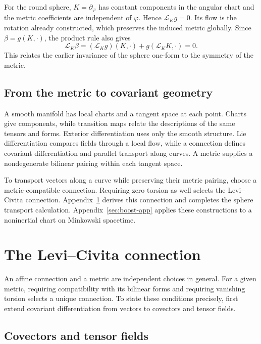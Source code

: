 \documentclass[11pt,a4paper]{article}
\numberwithin{equation}{section}
\newcommand{\Lie}{\mathcal L}
\newcommand{\slideref}[1]{\par\nobreak\smallskip\nobreak{\footnotesize\color{ink!60}\textsc{Source slide #1}}\par\nobreak\smallskip\nobreak}
\begin{document}
For the round sphere, \(K=\partial_\varphi\) has constant components
in the angular chart and the metric coefficients are independent of
\(\varphi\). Hence \(\Lie_Kg=0\). Its flow is the rotation already
constructed, which preserves the induced metric globally. Since
\(\beta=g(K,\cdot)\), the product rule also gives
\[
 \Lie_K\beta=(\Lie_Kg)(K,\cdot)+g(\Lie_KK,\cdot)=0.
\]
This relates the earlier invariance of the sphere one-form to the
symmetry of the metric.

\subsection{From the metric to covariant geometry}
\slideref{20}

A smooth manifold has local charts and a tangent space at each point.
Charts give components, while transition maps relate the descriptions
of the same tensors and forms. Exterior differentiation uses only the
smooth structure. Lie differentiation compares fields through a local
flow, while a connection defines covariant differentiation and
parallel transport along curves. A metric supplies a nondegenerate
bilinear pairing within each tangent space.

To transport vectors along a curve while preserving their metric
pairing, choose a metric-compatible connection. Requiring zero torsion
as well selects the Levi--Civita connection.
Appendix~\ref{sec:levi-civita} derives this connection and completes
the sphere transport calculation. Appendix~\ref{sec:boost-app}
applies these constructions to a noninertial chart on Minkowski
spacetime.

\appendix
\renewcommand{\thesection}{\Alph{section}}

\section{The Levi--Civita connection}
\label{sec:levi-civita}

An affine connection and a metric are independent choices in general.
For a given metric, requiring compatibility with its bilinear forms and
requiring vanishing torsion selects a unique connection. To state these
conditions precisely, first extend covariant differentiation from vectors
to covectors and tensor fields.

\subsection{Covectors and tensor fields}
\end{document}
